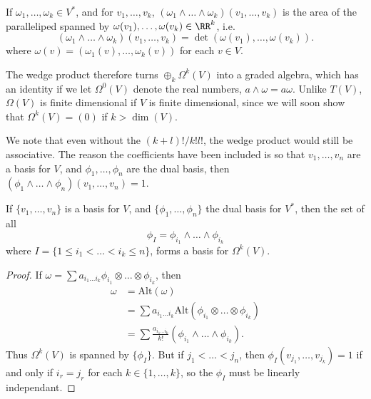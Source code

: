\begin{remark}
    If $\omega_1, \dots, \omega_k \in V^*$, and for $v_1, \dots, v_k$, $(\omega_1 \wedge \dots \wedge \omega_k)(v_1, \dots,v_k)$ is the area of the paralleliped spanned by $\omega(v_1), \dots, \omega(v_k) \in \RR^k$, i.e.
    \[ (\omega_1 \wedge \dots \wedge \omega_k)(v_1, \dots,v_k) = \det(\omega(v_1), \dots, \omega(v_k)). \]
    where $\omega(v) = (\omega_1(v), \dots, \omega_k(v))$ for each $v \in V$.
\end{remark}

The wedge product therefore turns $\oplus_k \Omega^k(V)$ into a graded algebra, which has an identity if we let $\Omega^0(V)$ denote the real numbers, $a \wedge \omega = a \omega$. Unlike $T(V)$, $\Omega(V)$ is finite dimensional if $V$ is finite dimensional, since we will soon show that $\Omega^k(V) = (0)$ if $k > \dim(V)$.

\begin{remark}
    We note that even without the $(k+l)! / k! l!$, the wedge product would still be associative. The reason the coefficients have been included is so that $v_1, \dots, v_n$ are a basis for $V$, and $\phi_1, \dots, \phi_n$ are the dual basis, then $(\phi_1 \wedge \dots \wedge \phi_n)(v_1, \dots, v_n) = 1$.
\end{remark}

\begin{theorem}
    If $\{ v_1, \dots, v_n \}$ is a basis for $V$, and $\{ \phi_1, \dots, \phi_n \}$ the dual basis for $V^*$, then the set of all
    \[ \phi_I = \phi_{i_1} \wedge \dots \wedge \phi_{i_k} \]
    where $I = \{ 1 \leq i_1 < \dots < i_k \leq n \}$, forms a basis for $\Omega^k(V)$.
\end{theorem}
\begin{proof}
    If $\omega = \sum a_{i_1 \dots i_k} \phi_{i_1} \otimes \dots \otimes \phi_{i_k}$, then
    \begin{align*}
        \omega &= \text{Alt}(\omega)\\
        &= \sum a_{i_1 \dots i_k} \text{Alt}(\phi_{i_1} \otimes \dots \otimes \phi_{i_k})\\
        &= \sum \frac{a_{i_1 \dots i_k}}{k!} (\phi_{i_1} \wedge \dots \wedge \phi_{i_k}).
    \end{align*}
    Thus $\Omega^k(V)$ is spanned by $\{ \phi_I \}$. But if $j_1 < \dots < j_n$, then $\phi_I(v_{j_1}, \dots, v_{j_k}) = 1$ if and only if $i_r = j_r$ for each $k \in \{ 1, \dots, k \}$, so the $\phi_I$ must be linearly independant.
\end{proof}

